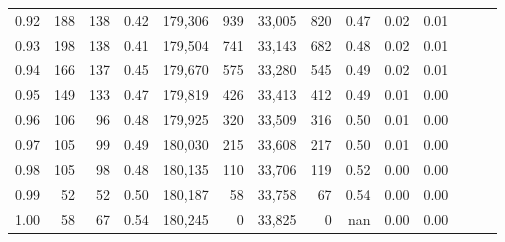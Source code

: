 \begin{tabular}{rrrrrrrrrrrrrr}
0.92 &    188 &  138 &  0.42 &  179,306 &      939 &  33,005 &     820 &  0.47 &  0.02 &      0.01 \\
0.93 &    198 &  138 &  0.41 &  179,504 &      741 &  33,143 &     682 &  0.48 &  0.02 &      0.01 \\
0.94 &    166 &  137 &  0.45 &  179,670 &      575 &  33,280 &     545 &  0.49 &  0.02 &      0.01 \\
0.95 &    149 &  133 &  0.47 &  179,819 &      426 &  33,413 &     412 &  0.49 &  0.01 &      0.00 \\
0.96 &    106 &   96 &  0.48 &  179,925 &      320 &  33,509 &     316 &  0.50 &  0.01 &      0.00 \\
0.97 &    105 &   99 &  0.49 &  180,030 &      215 &  33,608 &     217 &  0.50 &  0.01 &      0.00 \\
0.98 &    105 &   98 &  0.48 &  180,135 &      110 &  33,706 &     119 &  0.52 &  0.00 &      0.00 \\
0.99 &     52 &   52 &  0.50 &  180,187 &       58 &  33,758 &      67 &  0.54 &  0.00 &      0.00 \\
1.00 &     58 &   67 &  0.54 &  180,245 &        0 &  33,825 &       0 &   nan &  0.00 &      0.00 \\
\bottomrule
\end{tabular}
